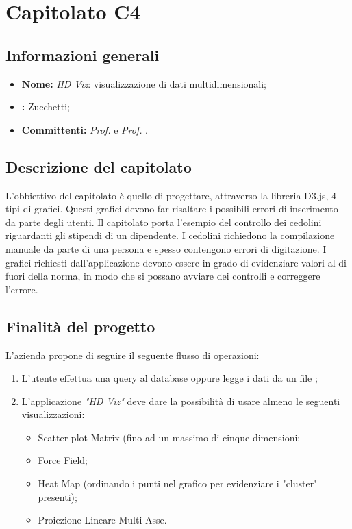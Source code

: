 \section{Capitolato C4}

\subsection{Informazioni generali}
\begin{itemize}
\item \textbf{Nome:} \textit{HD Viz}:  visualizzazione di dati multidimensionali;
\item \textbf{:} Zucchetti;
\item \textbf{Committenti:} \textit{Prof. \Tullio{}} e \textit{Prof. \Riccardo{}}.
\end{itemize}

\subsection{Descrizione del capitolato}
L'obbiettivo del capitolato è quello di progettare, attraverso la libreria D3.js, 4 tipi di grafici. Questi grafici devono far risaltare i possibili errori di inserimento da parte degli utenti.
Il capitolato porta l'esempio del controllo dei cedolini riguardanti gli stipendi di un dipendente. I cedolini richiedono la compilazione manuale da parte di una persona e spesso contengono errori di digitazione. I grafici richiesti dall'applicazione devono essere in grado di evidenziare valori al di fuori della norma, in modo che si possano avviare dei controlli e correggere l'errore.

\subsection{Finalità del progetto}
L'azienda propone di seguire il seguente flusso di operazioni:
\begin{enumerate}
\item L'utente effettua una query al database oppure legge i dati da un file ;
\item L'applicazione \textit{"HD Viz"} deve dare la possibilità di usare almeno le seguenti visualizzazioni:
    \begin{itemize}
    \item Scatter plot Matrix (fino ad un massimo di cinque dimensioni;
    \item Force Field;
    \item Heat Map (ordinando i punti nel grafico per evidenziare i "cluster" presenti);
    \item Proiezione Lineare Multi Asse.
    \end{itemize}
\end{enumerate}

